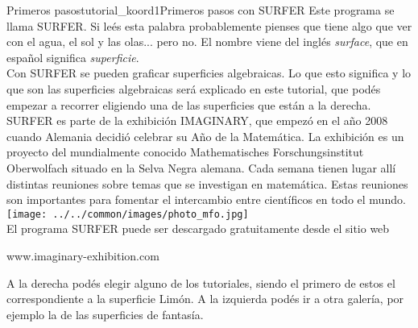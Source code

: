\begin{surferIntroPage}{Primeros pasos}{tutorial_koord1}{Primeros pasos con SURFER}
Este programa se llama SURFER. Si le\'es esta palabra probablemente pienses que tiene algo que ver con el agua, el sol y las olas... pero no. El nombre viene del ingl\'es {\it surface}, que en espa\~nol significa {\it superficie}.\\
Con SURFER se pueden graficar superficies algebraicas. Lo que esto significa y lo que son las superficies algebraicas ser\'a explicado en este tutorial, que pod\'es empezar a recorrer eligiendo una de las superficies que est\'an a la derecha.\\
SURFER es parte de la exhibici\'on IMAGINARY, que empez\'o en el a\~no 2008 cuando Alemania decidi\'o celebrar su A\~no de la Matem\'atica. La exhibici\'on es un proyecto del mundialmente conocido Mathematisches Forschungsinstitut Oberwolfach situado en la Selva Negra alemana. Cada semana tienen lugar all\'i distintas reuniones sobre temas que se investigan en matem\'atica. Estas reuniones son importantes para fomentar el intercambio entre cient\'ificos en todo el mundo. \\
\vspace{0.2cm} \hspace{3.5cm}\texttt{[image: ../../common/images/photo\_mfo.jpg]}\\
El programa SURFER puede ser descargado gratuitamente desde el sitio web \\
\begin{centering}
www.imaginary-exhibition.com\\
\end{centering}
 \vspace{0.2cm}
A la derecha pod\'es elegir alguno de los tutoriales, siendo el primero de estos el correspondiente a la superficie Lim\'on. A la izquierda pod\'es ir a otra galer\'ia, por ejemplo la de las superficies de fantas\'ia.
\end{surferIntroPage}